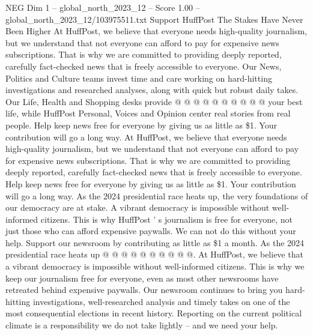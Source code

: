 \begin{textsample}{NEG Dim 1 – global\_north\_2023\_12 – Score 1.00 – global\_north\_2023\_12/103975511.txt}
Support HuffPost The Stakes Have Never Been Higher At HuffPost, we believe that everyone needs high-quality journalism, but we understand that not everyone can afford to pay for expensive news subscriptions.
That is why we are committed to providing deeply reported, carefully fact-checked news that is freely accessible to everyone.
Our News, Politics and Culture teams invest time and care working on hard-hitting investigations and researched analyses, along with quick but robust daily takes.
Our Life, Health and Shopping desks provide @ @ @ @ @ @ @ @ @ @ your best life, while HuffPost Personal, Voices and Opinion center real stories from real people.
Help keep news free for everyone by giving us as little as \$1.
Your contribution will go a long way.
At HuffPost, we believe that everyone needs high-quality journalism, but we understand that not everyone can afford to pay for expensive news subscriptions.
That is why we are committed to providing deeply reported, carefully fact-checked news that is freely accessible to everyone.
Help keep news free for everyone by giving us as little as \$1.
Your contribution will go a long way.
As the 2024 presidential race heats up, the very foundations of our democracy are at stake.
A vibrant democracy is impossible without well-informed citizens.
This is why HuffPost ' s journalism is free for everyone, not just those who can afford expensive paywalls.
We can not do this without your help.
Support our newsroom by contributing as little as \$1 a month.
As the 2024 presidential race heats up @ @ @ @ @ @ @ @ @ @.
At HuffPost, we believe that a vibrant democracy is impossible without well-informed citizens.
This is why we keep our journalism free for everyone, even as most other newsrooms have retreated behind expensive paywalls.
Our newsroom continues to bring you hard-hitting investigations, well-researched analysis and timely takes on one of the most consequential elections in recent history.
Reporting on the current political climate is a responsibility we do not take lightly -- and we need your help.

\end{textsample}
